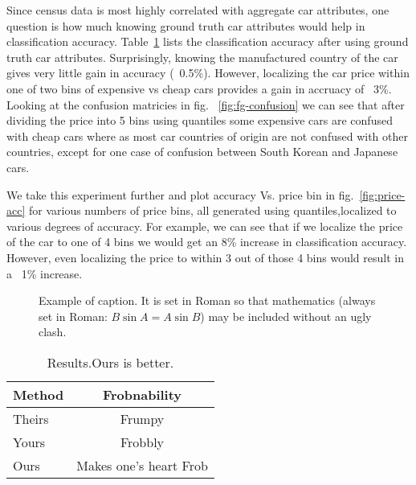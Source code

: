\documentclass[10pt,twocolumn,letterpaper]{article}
\begin{document}
Since census data is most highly correlated with aggregate car attributes, one question is how much knowing ground truth car attributes would help in classification accuracy. Table~\ref{table:car-att} lists the classification accuracy after using ground truth car attributes. Surprisingly, knowing the manufactured country of the car gives very little gain in accuracy (~0.5\%). However, localizing the car price within one of two bins of expensive vs cheap cars provides a gain in accruacy of ~3\%. Looking at the confusion matricies in fig. ~\ref{fig:fg-confusion} we can see that after dividing the price into 5 bins using quantiles some expensive cars are confused with cheap cars where as most car countries of origin are not confused with other countries, except for one case of confusion between South Korean and Japanese cars. 

We take this experiment further and plot accuracy Vs. price bin in fig.~\ref{fig:price-acc} for various numbers of price bins, all generated using quantiles,localized to various degrees of accuracy. For example, we can see that if we localize the price of the car to one of 4 bins we would get an 8\% increase in classification accuracy. However, even localizing the price to within 3 out of those 4 bins would result in a ~1\% increase.

\begin{figure}[t]
\begin{center}
\fbox{\rule{0pt}{2in} \rule{0.9\linewidth}{0pt}}
\end{center}
   \caption{Example of caption.  It is set in Roman so that mathematics
   (always set in Roman: $B \sin A = A \sin B$) may be included without an
   ugly clash.}
\label{fig:percent-error}
\end{figure}

\begin{table}
\begin{center}
\begin{tabular}{|l|c|}
\hline
Method & Frobnability \\
\hline\hline
Theirs & Frumpy \\
Yours & Frobbly \\
Ours & Makes one's heart Frob\\
\hline
\end{tabular}
\end{center}
\caption{Results.Ours is better.}
\label{table:car-att}
\end{table}
\end{document}
